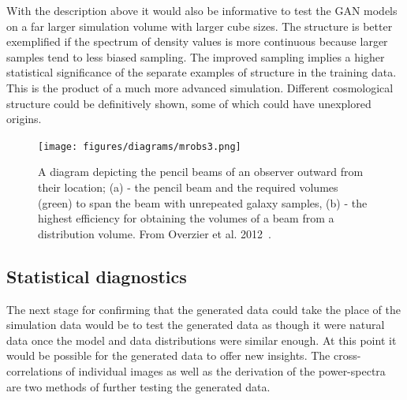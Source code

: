 \documentclass[twocolumn]{article}
\numberwithin{equation}{section}
\begin{document}
With the description above it would also be informative to test the GAN models on a far larger simulation volume with 
larger cube sizes. The structure is better exemplified if the spectrum of density values is more continuous because larger
samples tend to less biased sampling. The improved sampling implies a higher statistical significance of the separate 
examples of structure in the training data. This is the product of a much more advanced simulation. Different cosmological
structure could be definitively shown, some of which could have unexplored origins. 

\begin{figure}[hbt!]
\texttt{[image: figures/diagrams/mrobs3.png]}
\centering
\caption{A diagram depicting the pencil beams of an observer outward from their location; (a) - the pencil beam and the 
required volumes (green) to span the beam with unrepeated galaxy samples, (b) - the highest efficiency for obtaining the
volumes of a beam from a distribution volume. From Overzier et al. 2012~\cite{MRObs}.}
\label{fig:MRObs}
\end{figure}



\subsection{Statistical diagnostics}

The next stage for confirming that the generated data could take the place of the simulation data would be to test the 
generated data as though it were natural data once the model and data distributions were similar enough. At this point it 
would be possible for the generated data to offer new insights. The cross-correlations of individual images as well as the 
derivation of the power-spectra are two methods of further testing the generated data.
\end{document}
